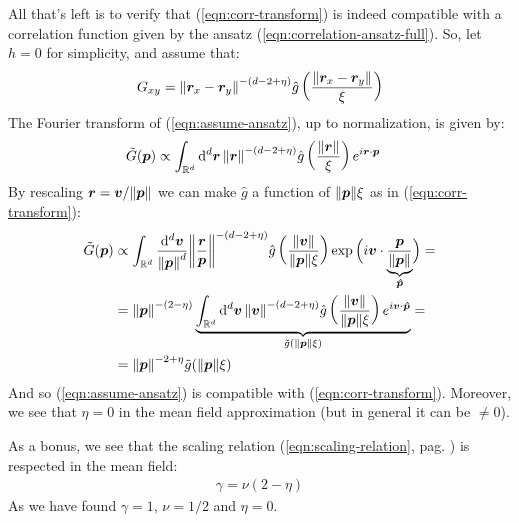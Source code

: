 \documentclass[../../main.tex]{subfiles}
\begin{document}
All that's left is to verify that (\ref{eqn:corr-transform}) is indeed compatible with a correlation function given by the ansatz (\ref{eqn:correlation-ansatz-full}). So, let $h=0$ for simplicity, and assume that:
\begin{align}\label{eqn:assume-ansatz}
    G_{xy} = \norm{\bm{r}_x - \bm{r}_y}^{-(d-2+\eta)} \hat{g}\left(\frac{\norm{\bm{r}_x - \bm{r}_y}}{\xi} \right)
\end{align}
The Fourier transform of (\ref{eqn:assume-ansatz}), up to normalization, is given by:
\begin{align*}
    \tilde{G}(\bm{p}) &\propto \int_{\mathbb{R}^d} \dd[d]{\bm{r}} \norm{\bm{r}}^{-(d-2+\eta)} \hat{g}\left(\frac{\norm{\bm{r}}}{\xi} \right) e^{i \bm{r} \cdot \bm{p}}
\end{align*}
By rescaling $\bm{r} = \bm{v}/\norm{\bm{p}}$ we can make $\hat{g}$ a function of $\norm{\bm{p}} \xi$ as in (\ref{eqn:corr-transform}):
\begin{align*}
    \tilde{G}(\bm{p}) &\propto \int_{\mathbb{R}^d} \frac{\dd^d{\bm{v}}}{\norm{\bm{p}}^d} \norm{\frac{\bm{r}}{\bm{p}} }^{-(d-2+\eta)} \hat{g}\left(\frac{\norm{\bm{v}}}{\norm{\bm{p}}\xi} \right) \exp \Big({i \bm{v} \cdot \underbrace{\frac{\bm{p}}{\norm{\bm{p}}}}_{\bm{\hat{p}}} }\Big) =\\
    &= \norm{\bm{p}}^{-(2-\eta)} \underbrace{\int_{\mathbb{R}^d} \dd[d]{\bm{v}} \norm{\bm{v}}^{-(d-2+\eta)} \hat{g}\left(\frac{\norm{\bm{v}}}{\norm{\bm{p}}\xi} \right) e^{i \bm{v} \cdot \bm{\hat{p}}}}_{\tilde{g}(\norm{\bm{p}}\xi)} =\\
    &= \norm{\bm{p}}^{-2 + \eta} \tilde{g}(\norm{\bm{p}} \xi)
\end{align*}
And so (\ref{eqn:assume-ansatz}) is compatible with (\ref{eqn:corr-transform}). Moreover, we see that $\eta = 0$ in the mean field approximation (but in general it can be $\neq 0$).

\medskip

As a bonus, we see that the scaling relation (\ref{eqn:scaling-relation}, pag. \pageref{eqn:scaling-relation}) is respected in the mean field:
\begin{align*}
    \gamma = \nu(2-\eta)
\end{align*}
As we have found $\gamma=1$, $\nu = 1/2$ and $\eta=0$.

\medskip
\end{document}
